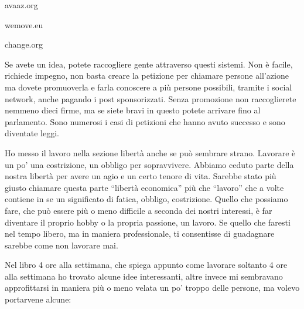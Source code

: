 \documentclass[12pt]{book} %
\begin{document}
\bigskip

avaaz.org

wemove.eu

change.org


\bigskip

Se avete un idea, potete raccogliere gente attraverso questi sistemi. Non è facile, richiede impegno, non basta creare
la petizione per chiamare persone all'azione ma dovete promuoverla e farla conoscere a più persone
possibili, tramite i social network, anche pagando i post sponsorizzati. Senza promozione non raccoglierete nemmeno
dieci firme, ma se siete bravi in questo potete arrivare fino al parlamento. Sono numerosi i casi di petizioni che
hanno avuto successo e sono diventate leggi.


\bigskip

Ho messo il lavoro nella sezione libertà anche se può sembrare strano. Lavorare è un po' una costrizione, un obbligo per
sopravvivere. Abbiamo ceduto parte della nostra libertà per avere un agio e un certo tenore di vita. Sarebbe stato più
giusto chiamare questa parte “libertà economica” più che “lavoro” che a volte contiene in se un significato di fatica,
obbligo, costrizione. Quello che possiamo fare, che può essere più o meno difficile a seconda dei nostri interessi, è
far diventare il proprio hobby o la propria passione, un lavoro. Se quello che faresti nel tempo libero, ma in maniera
professionale, ti consentisse di guadagnare sarebbe come non lavorare mai.


\bigskip

Nel libro 4 ore alla settimana, che spiega appunto come lavorare soltanto
4 ore alla settimana ho trovato alcune idee interessanti, altre invece mi sembravano approfittarsi in maniera più o
meno velata un po' troppo delle persone, ma volevo portarvene alcune:


\bigskip
\end{document}
